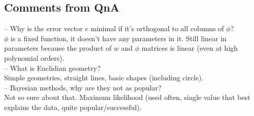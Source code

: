 \documentclass[a4paper,11pt]{article}
\begin{document}
	\subsection{Comments from QnA}
	-- Why is the error vector $e$ minimal if it's orthogonal to all columns of $\phi$?\vspace{3pt}\\
	$\phi$ is a fixed function, it doesn't have any parameters in it. Still linear in parameters because the product of $w$ and $\phi$ matrices is linear (even at high polynomial orders).\vspace{5pt}\\
	-- What is Euclidian geometry?\vspace{3pt}\\
	Simple geometries, straight lines, basic shapes (including circle).\vspace{5pt}\\
	-- Bayesian methods, why are they not as popular?\vspace{3pt}\\
	Not so sure about that. Maximum likelihood (used often, single value that best explains the data, quite popular/successful).
\end{document}
